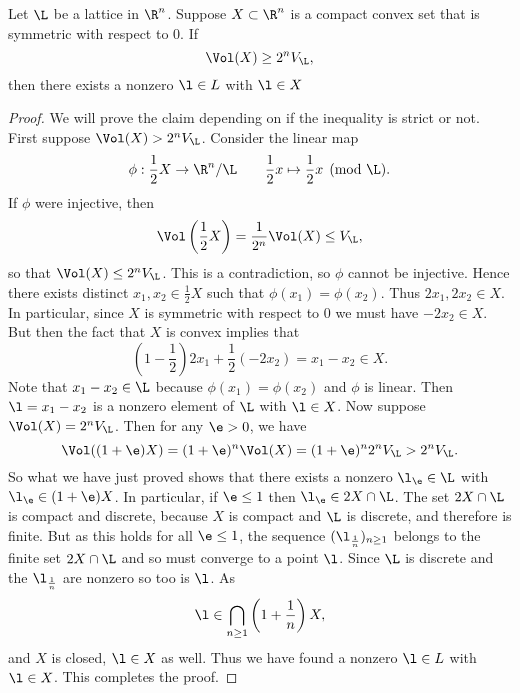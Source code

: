     \begin{lemma}
      Let $\L$ be a lattice in $\R^{n}$. Suppose $X \subset \R^{n}$ is a compact convex set that is symmetric with respect to $0$. If
      \[
        \Vol(X) \ge 2^{n}V_{\L},
      \]
      then there exists a nonzero $\l \in L$ with $\l \in X$ 
    \end{lemma}
    \begin{proof}
      We will prove the claim depending on if the inequality is strict or not. First suppose $\Vol(X) > 2^{n}V_{\L}$. Consider the linear map
      \[
        \phi:\frac{1}{2}X \to \R^{n}/\L \qquad \frac{1}{2}x \mapsto \frac{1}{2}x \pmod{\L}.
      \]
      If $\phi$ were injective, then
      \[
        \Vol\left(\frac{1}{2}X\right) = \frac{1}{2^{n}}\Vol(X) \le V_{\L}, 
      \]
      so that $\Vol(X) \le  2^{n}V_{\L}$. This is a contradiction, so $\phi$ cannot be injective. Hence there exists distinct $x_{1},x_{2} \in \frac{1}{2}X$ such that $\phi(x_{1}) = \phi(x_{2})$. Thus $2x_{1},2x_{2} \in X$. In particular, since $X$ is symmetric with respect to $0$ we must have $-2x_{2} \in X$. But then the fact that $X$ is convex implies that
      \[
        \left(1-\frac{1}{2}\right)2x_{1}+\frac{1}{2}(-2x_{2}) = x_{1}-x_{2} \in X.
      \]
      Note that $x_{1}-x_{2} \in \L$ because $\phi(x_{1}) = \phi(x_{2})$ and $\phi$ is linear. Then $\l = x_{1}-x_{2}$ is a nonzero element of $\L$ with $\l \in X$. Now suppose $\Vol(X) = 2^{n}V_{\L}$. Then for any $\e > 0$, we have
      \[
        \Vol((1+\e)X) = (1+\e)^{n}\Vol(X) = (1+\e)^{n}2^{n}V_{\L} > 2^{n}V_{\L}.
      \]
      So what we have just proved shows that there exists a nonzero $\l_{\e} \in \L$ with $\l_{\e} \in (1+\e)X$. In particular, if $\e \le 1$ then $\l_{\e} \in 2X \cap \L$. The set $2X \cap \L$ is compact and discrete, because $X$ is compact and $\L$ is discrete, and therefore is finite. But as this holds for all $\e \le 1$, the sequence $(\l_{\frac{1}{n}})_{n \ge 1}$ belongs to the finite set $2X \cap \L$ and so must converge to a point $\l$. Since $\L$ is discrete and the $\l_{\frac{1}{n}}$ are nonzero so too is $\l$. As
      \[
        \l \in \bigcap_{n \ge 1}\left(1+\frac{1}{n}\right)X,
      \]
      and $X$ is closed, $\l \in X$ as well. Thus we have found a nonzero $\l \in L$ with $\l \in X$. This completes the proof.
    \end{proof}

